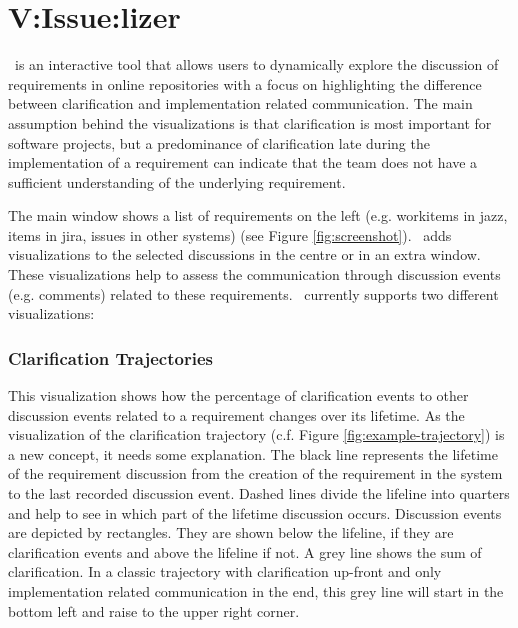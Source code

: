 \section{V:Issue:lizer}
\viss\ is an interactive tool that allows users to dynamically explore the discussion of requirements  in online repositories with a focus on highlighting the difference between clarification and implementation related communication.
The main assumption behind the visualizations is that clarification is most important for software projects, but a predominance of clarification late during the implementation of a requirement can indicate that the team does not have a sufficient understanding of the underlying requirement.

The main window shows a list of requirements on the  left (e.g. workitems in jazz, items in jira, issues in other systems) (see Figure \ref{fig:screenshot}).
\viss\ adds visualizations to the selected discussions in the centre or in an extra window. These visualizations help to assess the communication through discussion events (e.g. comments) related to these requirements.
%
\viss\ currently supports two different visualizations: 

\subsubsection{Clarification Trajectories} 
This visualization shows how the percentage of clarification events to other discussion events related to a requirement changes over its lifetime.
As the visualization of the clarification trajectory (c.f. Figure \ref{fig:example-trajectory}) is a new concept, it needs some explanation.
The black line represents the lifetime of the requirement discussion from the creation of the requirement in the system to the last recorded discussion event.
Dashed lines divide the lifeline into quarters and help to see in which part of the lifetime discussion occurs.
Discussion events are depicted by rectangles.
They are shown below the lifeline, if they are clarification events and above the lifeline if not.
A grey line shows the sum of clarification.
In a classic trajectory with clarification up-front and only implementation related communication in the end, this grey line will start in the bottom left and raise to the upper right corner.

